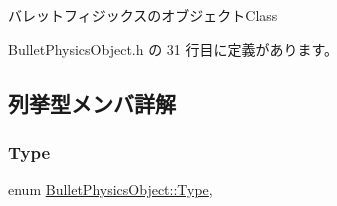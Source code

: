 バレットフィジックスのオブジェクト\+Class 

 Bullet\+Physics\+Object.\+h の 31 行目に定義があります。



\subsection{列挙型メンバ詳解}
\mbox{\label{class_bullet_physics_object_ac428a5598df5fd4a450197e021420927}} 
\subsubsection{\texorpdfstring{Type}{Type}}
{\footnotesize\ttfamily enum \mbox{\hyperlink{class_bullet_physics_object_ac428a5598df5fd4a450197e021420927}{Bullet\+Physics\+Object\+::\+Type}}\hspace{0.3cm}{\ttfamily [strong]}, {\ttfamily [private]}}

